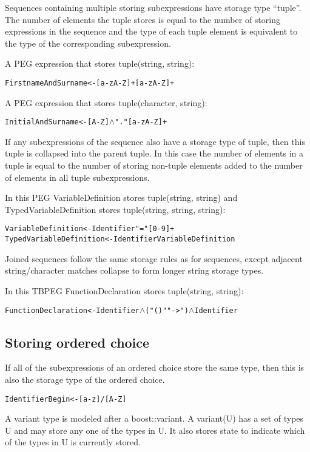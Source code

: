 \documentclass[a4paper,11pt]{article}
\begin{document}
Sequences containing multiple storing subexpressions have storage type ``tuple''.
The number of elements the tuple stores is equal to the number of storing expressions in the sequence and the type of each tuple element is equivalent to the type of the corresponding subexpression.

A PEG expression that stores tuple(string, string):
\begin{alltt}
    FirstnameAndSurname <- [a-zA-Z]+ [a-zA-Z]+
\end{alltt}

A PEG expression that stores tuple(character, string):
\begin{alltt}
    InitialAndSurname <- [A-Z] \(\wedge\) "." [a-zA-Z]+
\end{alltt}

If any subexpressions of the sequence also have a storage type of tuple, then this tuple is collapsed into the parent tuple.
In this case the number of elements in a tuple is equal to the number of storing non-tuple elements added to the number of elements in all tuple subexpressions.

In this PEG VariableDefinition stores tuple(string, string) and TypedVariableDefinition stores tuple(string, string, string):
\begin{alltt}
    VariableDefinition      <- Identifier "=" [0-9]+
    TypedVariableDefinition <- Identifier VariableDefinition
\end{alltt}

Joined sequences follow the same storage rules as for sequences, except adjacent string/character matches collapse to form longer string storage types.

In  this TBPEG FunctionDeclaration stores tuple(string, string):
\begin{alltt}
    FunctionDeclaration <- Identifier \(\wedge\) ("()"  "->") \(\wedge\) Identifier
\end{alltt}

\subsection{Storing ordered choice}
If all of the subexpressions of an ordered choice store the same type, then this is also the storage type of the ordered choice.
\begin{alltt}
    IdentifierBegin <- [a-z] / [A-Z]
\end{alltt}

A variant type is modeled after a boost::variant\cite{boostvariant}.
A variant(U) has a set of types U and may store any one of the types in U.
It also stores state to indicate which of the types in U is currently stored.
\end{document}
